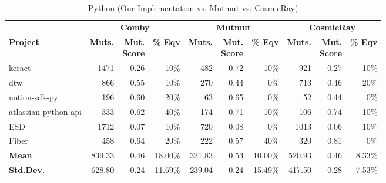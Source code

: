 \documentclass[sigconf,review, anonymous]{acmart}
\newcommand{\mc}[3]{\multicolumn{#1}{#2}{#3}}
\begin{document}
{\begin{table*}[htbp]
\centering
{
\caption{Python (Our Implementation vs. Mutmut vs. CosmicRay)}
\label{tab:table_python2}
\begin{tabular}{l|rrr|rrr|rrr}
\toprule
                 & \mc{3}{c|}{\textbf{Comby}}   & \mc{3}{c|}{\textbf{Mutmut}} & \mc{3}{c}{\textbf{CosmicRay}} \\
\textbf{Project} & \textbf{Muts.} &  \makecell{\textbf{Mut.} \\ \textbf{Score}} & \textbf{\% Eqv}
& \textbf{Muts.} &  \makecell{\textbf{Mut.} \\ \textbf{Score}} & \textbf{\% Eqv} 
& \textbf{Muts.} &  \makecell{\textbf{Mut.} \\ \textbf{Score}} & \textbf{\% Eqv} \\ \midrule
\midrule
keract & 1471 & 0.26 & 10\% & 482 & 0.72 & 10\% & 921 & 0.27 & 10\% \\
dtw & 866 & 0.55 & 10\% & 270 & 0.44 & 0\% & 713 & 0.46 & 20\% \\
notion-sdk-py & 196 & 0.60 & 20\% & 63 & 0.65 & 0\% & 52 & 0.44 & 0\% \\
atlassian-python-api & 333 & 0.62 & 40\% & 174 & 0.71 & 10\% & 106 & 0.74 & 10\% \\
ESD & 1712 & 0.07 & 10\% & 720 & 0.08 & 0\% & 1013 & 0.06 & 10\% \\
Fiber & 458 & 0.64 & 20\% & 222 & 0.57 & 40\% & 320 & 0.81 & 0\% \\\midrule
\textbf{Mean} &  839.33 & 0.46 & 18.00\% & 321.83 & 0.53 & 10.00\% & 520.93 & 0.46 & 8.33\% \\
\textbf{Std.Dev.} &  628.80 & 0.24 & 11.69\% & 239.04 & 0.24 & 15.49\% & 417.50 & 0.28 & 7.53\% \\\bottomrule        
\end{tabular}
}
\end{table*}



}
\end{document}
